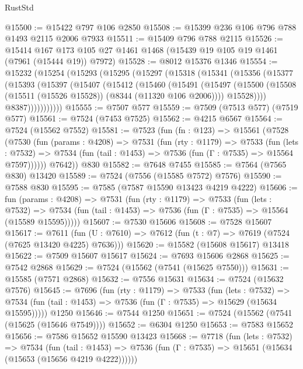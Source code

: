 \begin{lexlean}{RustStd}
\begin{coremodule}
@15500 := @15422 @797 @106 @2850
@15508 := @15399 @236 @106 @796 @788 @1493 @2115 @2006 @7933
@15511 := @15409 @796 @788 @2115
@15526 := @15414
    @167
    @173
    @105
    @27
    @1461
    @1468
    (@15439 @19 @105 @19 @1461 (@7961 (@15444 @19)) @7972)
@15528 := @8012 @15376 @1346
@15554 := @15232
    (@15254
      (@15293
        (@15295
          (@15297
            (@15318
              (@15341
                (@15356
                  (@15377
                    (@15393
                      (@15397
                        (@15407
                          (@15412
                            (@15460
                              (@15491
                                (@15497
                                  (@15500
                                    (@15508 (@15511 (@15526 @15528)) (@8344 (@11320 @106 @2006))))
                                  @15528))))
                          @8387)))))))))))
@15555 := @7507 @577
@15559 := @7509 (@7513 @577) (@7519 @577)
@15561 := @7524 (@7453 @7525)
@15562 := @4215 @6567
@15564 := @7524 (@15562 @7552)
@15581 := @7523
    (fun (fn : @123) =>
    @15561
      (@7528
        (@7530
          (fun (params : @4208) =>
          @7531
            (fun (rty : @1179) =>
            @7533
              (fun (lets : @7532) =>
              @7534 (fun (tail : @1453) => @7536 (fun (Γ : @7535) => @15564 @7597))))))
        @7642))
    @830
@15582 := @7648 @7455
@15585 := @7564 (@7565 @830) @13420
@15589 := @7524 (@7556 (@15585 @7572) @7576)
@15590 := @7588 @830
@15595 := @7585 (@7587 @15590 @13423 @4219 @4222)
@15606 := fun (params : @4208) =>
  @7531
    (fun (rty : @1179) =>
    @7533
      (fun (lets : @7532) =>
      @7534 (fun (tail : @1453) => @7536 (fun (Γ : @7535) => @15564 (@15589 @15595)))))
@15607 := @7530 @15606
@15608 := @7528 @15607
@15617 := @7611
    (fun (U : @7610) => @7612 (fun (t : @7) => @7619 (@7524 (@7625 @13420 @4225) @7636)))
@15620 := @15582 (@15608 @15617) @13418
@15622 := @7509 @15607 @15617
@15624 := @7693 @15606 @2868
@15625 := @7542 @2868
@15629 := @7524 (@15562 (@7541 (@15625 @7550)))
@15631 := @15585 (@7571 @2868)
@15632 := @7556 @15631
@15634 := @7524 (@15632 @7576)
@15645 := @7696
    (fun (rty : @1179) =>
    @7533
      (fun (lets : @7532) =>
      @7534 (fun (tail : @1453) => @7536 (fun (Γ : @7535) => @15629 (@15634 @15595)))))
    @1250
@15646 := @7544 @1250
@15651 := @7524 (@15562 (@7541 (@15625 (@15646 @7549))))
@15652 := @6304 @1250
@15653 := @7583 @15652
@15656 := @7586 @15652 @15590 @13423
@15668 := @7718
    (fun (lets : @7532) =>
    @7534
      (fun (tail : @1453) =>
      @7536 (fun (Γ : @7535) => @15651 (@15634 (@15653 (@15656 @4219 @4222))))))

\end{coremodule}
\end{lexlean}
